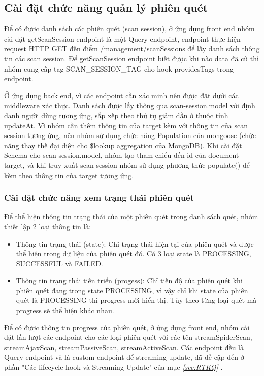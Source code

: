 \subsection{Cài đặt chức năng quản lý phiên quét} \label{subsec:CaiDatQuanLyPhienQuet}

\tab Để có được danh sách các phiên quét (scan session), ở ứng dụng front end nhóm cài đặt getScanSession endpoint là một Query endpoint, endpoint thực hiện request HTTP GET đến điểm /management/scanSessions để lấy danh sách thông tin các scan session. Để getScanSession endpoint biết được khi nào data đã cũ thì nhóm cung cấp tag SCAN\_SESSION\_TAG cho hook providesTags trong endpoint.

Ở ứng dụng back end, vì các endpoint cần xác minh nên được đặt dưới các middleware xác thực. Danh sách được lấy thông qua scan-session.model với định danh người dùng tương ứng, sắp xếp theo thứ tự giảm dần ở thuộc tính updateAt. Vì nhóm cần thêm thông tin của target kèm với thông tin của scan session tương ứng, nên nhóm sử dụng chức năng Population của mongoose (chức năng thay thế đại diện cho \$lookup aggregation của MongoDB). Khi cài đặt Schema cho scan-session.model, nhóm tạo tham chiếu đến id của document target, và khi truy xuất scan session nhóm sử dụng phương thức populate() để kèm theo thông tin của target tương ứng.

\subsubsection{Cài đặt chức năng xem trạng thái phiên quét} \label{subsubsec:CaiDatXemTrangThaiPhienQuet}

\tab Để thể hiện thông tin trạng thái của một phiên quét trong danh sách quét, nhóm thiết lập 2 loại thông tin là:

\begin{itemize}
  \item Thông tin trạng thái (state): Chỉ trạng thái hiện tại của phiên quét và được thể hiện trong dữ liệu của phiên quét đó.
        Có 3 loại state là PROCESSING, SUCCESSFUL và FAILED.
  \item Thông tin trạng thái tiến triển (progess): Chỉ tiến độ của phiên quét khi phiên quét đang trong state PROCESSING, vì vậy chỉ khi state của phiên quét là PROCESSING thì progress mới hiển thị.
        Tùy theo từng loại quét mà progress sẽ thể hiện khác nhau.
\end{itemize}

Để có được thông tin progress của phiên quét, ở ứng dụng front end, nhóm cài đặt lần lượt các endpoint cho các loại phiên quét với các tên streamSpiderScan, streamAjaxScan, streamPassiveScan, streamActiveScan.
Các endpoint đều là Query endpoint và là custom endpoint để streaming update, đã đề cập đến ở phần "Các lifecycle hook và Streaming Update" của mục \textit{\ref{sec:RTKQ} }.

